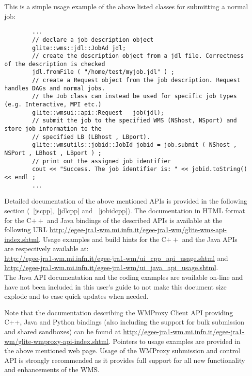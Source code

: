 \documentclass{egee}
\begin{document}
\newpage

This is a simple usage example of the above listed classes for submitting a normal job:

\begin{scriptsize}
\begin{verbatim}
        ...
        // declare a job description object 
        glite::wms::jdl::JobAd jdl; 	
        // create the description object from a jdl file. Correctness of the description is checked 
        jdl.fromFile ( "/home/test/myjob.jdl" ) ; 
        // create a Request object from the job description. Request handles DAGs and normal jobs.
        // the Job class can instead be used for specific job types (e.g. Interactive, MPI etc.)
        glite::wmsui::api::Request   job(jdl);	
        // submit the job to the specified WMS (NShost, NSport) and store job information to the 
        // specified LB (LBhost , LBport).   
        glite::wmsutils::jobid::JobId jobid = job.submit ( NShost , NSPort , LBhost , LBport ) ;
        // print out the assigned job identifier 
        cout << "Success. The job identifier is: " << jobid.toString() << endl ;
        ...
\end{verbatim}
\end{scriptsize}
\smallskip


Detailed documentation of the above mentioned APIs is provided in the following section (~\ref{jscpp},~\ref{jdlcpp} 
and ~\ref{jobidcpp}). The documentation in HTML format for the C$++$ and Java bindings of the described 
APIs is available at the following URL \url{http://egee-jra1-wm.mi.infn.it/egee-jra1-wm/glite-wms-api-index.shtml}. 
Usage examples and build hints for the C$++$ and the Java APIs are respectively available at: \\
\url{http://egee-jra1-wm.mi.infn.it/egee-jra1-wm/ui_cpp_api_usage.shtml} and \\ 
\url{http://egee-jra1-wm.mi.infn.it/egee-jra1-wm/ui_java_api_usage.shtml}. \\
The Java API documentation and the coding examples are available on-line and have not been included in this 
user's guide to not make this document size explode and to ease quick updates when needed.  

Note that the documentation describing the WMProxy Client API providing C++, Java and Python bindings
(also including the support for bulk submission and shared sandboxes) can be found at 
\url{http://egee-jra1-wm.mi.infn.it/egee-jra1-wm/glite-wmproxy-api-index.shtml}.
Pointers to usage examples are provided in the above mentioned web page.
Usage of the WMProxy submission and control API is strongly recommended as it provides full            
support for all new functionality and enhancements of the WMS.
\end{document}
